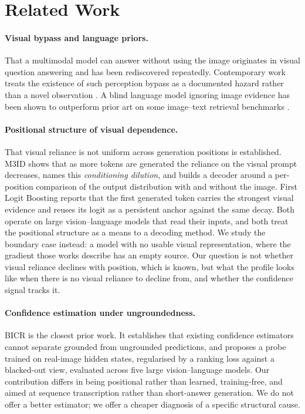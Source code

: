 \documentclass{article}
\begin{document}
\section{Related Work}

\paragraph{Visual bypass and language priors.} That a multimodal model can answer without
using the image originates in visual question answering and has been rediscovered repeatedly.
Contemporary work treats the existence of such perception bypass as a documented hazard rather
than a novel observation \citep{xu2026bypass}. A blind language model ignoring
image evidence has been shown to outperform prior art on some image--text retrieval benchmarks
\citep{lin2024priors}.

\paragraph{Positional structure of visual dependence.} That visual reliance is not uniform
across generation positions is established. M3ID \citep{favero2024m3id} shows that as more
tokens are generated the reliance on the visual prompt decreases, names this \emph{conditioning
dilution}, and builds a decoder around a per-position comparison of the output distribution
with and without the image. First Logit Boosting \citep{ha2026flb} reports that the first
generated token carries the strongest visual evidence and reuses its logit as a persistent
anchor against the same decay. Both operate on large vision--language models that read their
inputs, and both treat the positional structure as a means to a decoding method. We study the
boundary case instead: a model with no usable visual representation, where the gradient those
works describe has an empty source. Our question is not whether visual reliance declines with
position, which is known, but what the profile looks like when there is no visual reliance to
decline from, and whether the confidence signal tracks it.

\paragraph{Confidence estimation under ungroundedness.} BICR \citep{khanmohammadi2026bicr} is
the closest prior work. It establishes that existing confidence estimators cannot separate
grounded from ungrounded predictions, and proposes a probe trained on real-image hidden
states, regularised by a ranking loss against a blacked-out view, evaluated across five large
vision--language models. Our contribution differs in being positional rather than learned,
training-free, and aimed at sequence transcription rather than short-answer generation. We do
not offer a better estimator; we offer a cheaper diagnosis of a specific structural cause.
\end{document}
